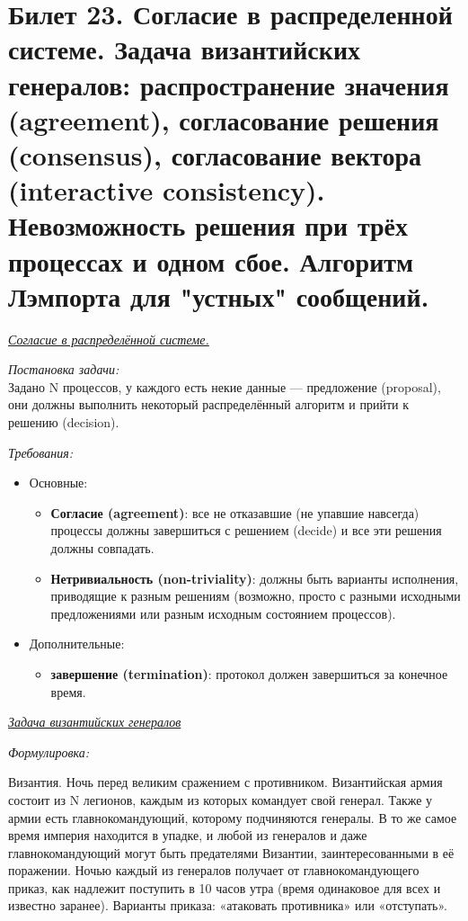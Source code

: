 \newpage
\section{Билет 23. Согласие в распределенной системе. Задача византийских генералов: распространение значения (agreement), согласование решения (consensus), согласование вектора (interactive consistency). Невозможность решения при трёх процессах и одном сбое. Алгоритм Лэмпорта для "устных" сообщений.}


\begin{center}
    \textit{\underline{Согласие в распределённой системе.}}
\end{center}

\textit{Постановка задачи:} \\
Задано N процессов, у каждого есть некие данные — предложение (proposal), они должны выполнить некоторый распределённый алгоритм и прийти к решению (decision).

\textit{Требования:} 
\begin{itemize}
\item Основные:
\begin{itemize}
\item \textbf{Согласие (agreement)}: все не отказавшие (не упавшие навсегда) процессы должны завершиться с решением (decide) и все эти решения должны совпадать.
\item \textbf{Нетривиальность (non-triviality)}: должны быть варианты исполнения, приводящие к разным решениям (возможно, просто с разными исходными предложениями или разным исходным состоянием процессов).
\end{itemize}
\item Дополнительные: 
\begin{itemize}
\item \textbf{завершение (termination)}: протокол должен завершиться за конечное время.
\end{itemize}
\end{itemize}


\begin{center}
    \hypertarget{Byzantine_fault} {\textit{\underline{Задача византийских генералов}}}
\end{center}

\textit{Формулировка: }

Византия. Ночь перед великим сражением с противником. Византийская армия состоит из N легионов, каждым из которых командует свой генерал. Также у армии есть главнокомандующий, которому подчиняются генералы. В то же самое время империя находится в упадке, и любой из генералов и даже главнокомандующий могут быть предателями Византии, заинтересованными в её поражении. Ночью каждый из генералов получает от главнокомандующего приказ, как надлежит поступить в 10 часов утра (время одинаковое для всех и известно заранее). Варианты приказа: «атаковать противника» или «отступать».

